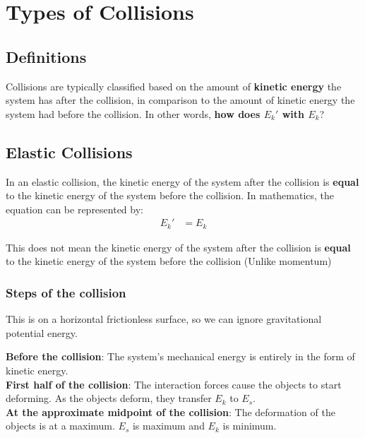 \section{Types of Collisions}
\subsection{Definitions}
Collisions are typically classified based on the amount of \textbf{kinetic energy} the system has after the 
collision, in comparison to the amount of kinetic energy the system had before the collision. In other words,
\textbf{how does $E_k'$ with $E_{k}$}?

\subsection{Elastic Collisions}
In an elastic collision, the kinetic energy of the system after the collision is \textbf{equal} to the kinetic
energy of the system before the collision. In mathematics, the equation can be represented by:
\begin{align*}
    E_k' &= E_k
\end{align*}

\begin{remark}
    This does not mean the kinetic energy of the system after the collision is \textbf{equal} to the kinetic 
    energy of the system before the collision (Unlike momentum)
\end{remark}

\subsubsection{Steps of the collision} 
\begin{remark}
    This is on a horizontal frictionless surface, so we can ignore gravitational potential energy.
\end{remark}
    \textbf{Before the collision}: The system's mechanical energy is entirely in the form of kinetic energy. \\

    \textbf{First half of the collision}: The interaction forces cause the objects to start deforming. As the objects deform, 
    they transfer $E_k$ to $E_s$.\\

    \textbf{At the approximate midpoint of the collision}: The deformation of the objects is at a maximum. $E_s$ is maximum and $E_k$ is minimum.\\

